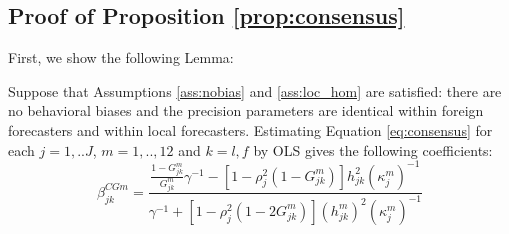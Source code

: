 \subsection{Proof of Proposition \ref{prop:consensus}}
\label{proof:consensus}

First, we show the following Lemma:
\begin{lemma}\label{lemma:consensus} Suppose that Assumptions \ref{ass:nobias} and \ref{ass:loc_hom} are satisfied: there are no behavioral biases and the precision parameters are identical within foreign forecasters and within local forecasters. Estimating Equation \eqref{eq:consensus} for each $j=1,..J$, $m=1,..,12$ and $k=l,f$ by OLS gives the following coefficients:
$$\beta^{CGm}_{jk}=\frac{\frac{1-G_{jk}^m}{G_{jk}^m}\gamma^{-1}-[1-\rho_j^2(1-G_{jk}^m)]h_{jk}^2(\kappa_j^m)^{-1}}{\gamma^{-1}+[1-\rho_j^2(1-2G_{jk}^m)](h_{jk}^m)^2(\kappa_j^m)^{-1}}$$
\end{lemma}

